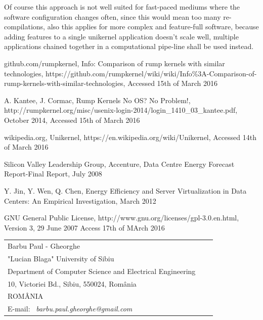\documentclass[10pt,a4paper,twoside]{article}
\begin{document}
 Of course this approach is not well suited for fast-paced mediums where the software configuration changes often,
 since this would mean too many re-compilations, also this applies for more complex and feature-full software,
 because adding features to a single unikernel application doesn't scale well,
 multiple applications chained together in a computational pipe-line shall be used instead.

\begin{thebibliography}{*}\label{Refences}
github.com/rumpkernel, \newblock Info: Comparison of rump kernels with similar technologies,
\newblock https://github.com/rumpkernel/wiki/wiki/Info\%3A-Comparison-of-rump-kernels-with-similar-technologies,
\newblock Accessed 15th of March 2016

\vspace{-7pt}
A. Kantee, J. Cormac, \newblock Rump Kernels No OS? No Problem!,
\newblock http://rumpkernel.org/misc/usenix-login-2014/login\_1410\_03\_kantee.pdf,
\newblock October 2014,
\newblock Accessed 15th of March 2016

\vspace{-7pt}
wikipedia.org, \newblock Unikernel,
\newblock https://en.wikipedia.org/wiki/Unikernel,
\newblock Accessed 14th of March 2016

\vspace{-7pt}
Silicon Valley Leadership Group, Accenture, \newblock
Data Centre Energy Forecast Report-Final Report, \newblock July 2008

\vspace{-7pt}
Y. Jin, Y. Wen, Q. Chen,
\newblock Energy Efficiency and Server Virtualization in Data Centers: An Empirical Investigation,
\newblock March 2012

GNU General Public License, \newblock http://www.gnu.org/licenses/gpl-3.0.en.html,
\newblock Version 3, 29 June 2007
\newblock Access 17th of MArch 2016

\end{thebibliography}

\vspace*{1cm} {\footnotesize
\begin{tabular*}{16cm}{p{4.2cm}p{4.2cm}p{4.2cm}}
Barbu Paul - Gheorghe & \\
"Lucian Blaga" University of Sibiu & \\
Department of Computer Science and Electrical Engineering & \\
10, Victoriei Bd., Sibiu, 550024, Rom\^ania & \\
ROM\^ANIA & \\
E-mail: \ {\it barbu.paul.gheorghe@gmail.com}&
\end{tabular*}}
\end{document}
